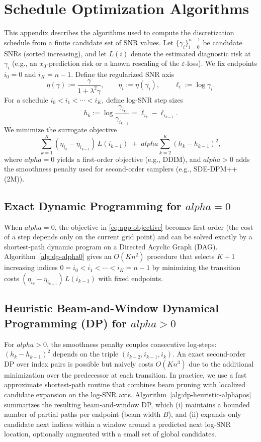 \documentclass[11pt]{article}
\def\alpha{alpha}%
\theoremstyle{definition}
\numberwithin{equation}{section}
\begin{document}
\section{Schedule Optimization Algorithms}
\label{app:schedule-optimization}

This appendix describes the algorithms used to compute the discretization schedule from a finite candidate set of
SNR values. Let $\{\gamma_i\}_{i=0}^{n-1}$ be candidate SNRs (sorted increasing), and let $L(i)$ denote the
estimated diagnostic risk at $\gamma_i$ (e.g., an $x_0$-prediction risk or a known rescaling of the
$\varepsilon$-loss). We fix endpoints $i_0=0$ and $i_K=n-1$.
Define the regularized SNR axis
\[
\eta(\gamma) := \frac{\gamma}{1+\lambda^2\gamma},\qquad
\eta_i := \eta(\gamma_i),\qquad
\ell_i := \log\gamma_i .
\]
For a schedule $i_0<i_1<\cdots<i_K$, define log-SNR step sizes
\[
h_k := \log\frac{\gamma_{i_k}}{\gamma_{i_{k-1}}} = \ell_{i_k}-\ell_{i_{k-1}} .
\]
We minimize the surrogate objective
\begin{equation}
\label{eq:app-objective}
\sum_{k=1}^{K}(\eta_{i_k}-\eta_{i_{k-1}})\,L(i_{k-1})
\;+\;
\alpha \sum_{k=2}^{K}(h_k-h_{k-1})^2 ,
\end{equation}
where $\alpha=0$ yields a first-order objective (e.g., DDIM), and $\alpha>0$ adds the smoothness penalty used for
second-order samplers (e.g., SDE-DPM++(2M)).

\subsection{Exact Dynamic Programming for $\alpha=0$}
When $\alpha=0$, the objective in \eqref{eq:app-objective} becomes first-order (the cost of a step depends only on
the current grid point) and can be solved exactly by a shortest-path dynamic program on a Directed Acyclic Graph (DAG).
Algorithm~\ref{alg:dp-alpha0} gives an $O(Kn^2)$ procedure that selects $K{+}1$ increasing indices
$0=i_0<i_1<\cdots<i_K=n-1$ by minimizing the transition costs
$(\eta_{i_k}-\eta_{i_{k-1}})\,L(i_{k-1})$ with fixed endpoints.


\subsection{Heuristic Beam-and-Window Dynamical Programming (DP) for $\alpha>0$}
For $\alpha>0$, the smoothness penalty couples consecutive log-steps:
$(h_k-h_{k-1})^2$ depends on the triple $(i_{k-2},i_{k-1},i_k)$.
An exact second-order DP over index pairs is possible but naively costs $O(Kn^3)$ due to the additional
minimization over the predecessor at each transition.
In practice, we use a fast approximate shortest-path routine that combines beam pruning with localized candidate
expansion on the log-SNR axis.
Algorithm~\ref{alg:dp-heuristic-alphapos} summarizes the resulting beam-and-window DP, which (i) maintains a bounded
number of partial paths per endpoint (beam width $B$), and (ii) expands only candidate next indices within a window
around a predicted next log-SNR location, optionally augmented with a small set of global candidates.
\end{document}
